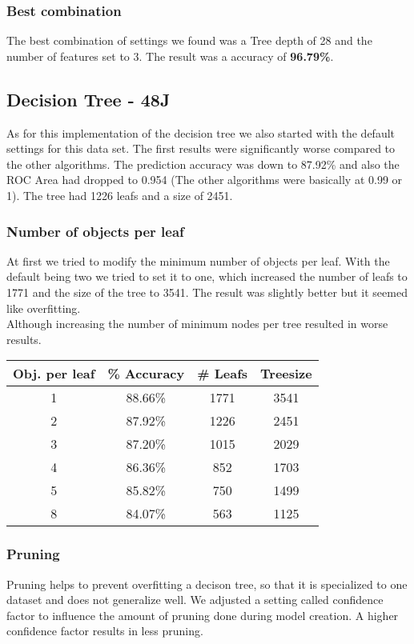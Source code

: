 \documentclass{article}
\begin{document}
\subsubsection{Best combination}
The best combination of settings we found was a Tree depth of 28 and the number of features set to 3. The result was a accuracy of \textbf{96.79\%}.
\subsection{Decision Tree - 48J}
As for this implementation of the decision tree we also started with the default settings for this data set. The first results were significantly worse compared to the other algorithms. The prediction accuracy was down to 87.92\% and also the ROC Area had dropped to 0.954 (The other algorithms were basically at 0.99 or 1). The tree had 1226 leafs and a size of 2451.
 \subsubsection{Number of objects per leaf}
 At first we tried to modify the minimum number of objects per leaf. With the default being two we tried to set it to one, which increased the number of leafs to 1771 and the size of the tree to 3541. The result was slightly better but it seemed like overfitting. \\
 Although increasing the number of minimum nodes per tree resulted in worse results.\\
 
 \begin{center}
 \begin{tabular}{ c | c | c | c}
 \textbf{Obj. per leaf} & \textbf{\% Accuracy} & \textbf{\# Leafs} & \textbf{Treesize}\\
 \hline
 1 & 88.66\% & 1771 & 3541\\
 2 & 87.92\% & 1226 & 2451\\
 3 & 87.20\% & 1015 & 2029\\
 4 & 86.36\% & 852 & 1703\\
 5 & 85.82\% & 750 & 1499\\
 8 & 84.07\% & 563 & 1125\\
 \end{tabular}
 \end{center}
 
 \subsubsection{Pruning}
 Pruning helps to prevent overfitting a decison tree, so that it is specialized to one dataset and does not generalize well. We adjusted a setting called confidence factor to influence the amount of pruning done during model creation. A higher confidence factor results in less pruning.
 
\end{document}
